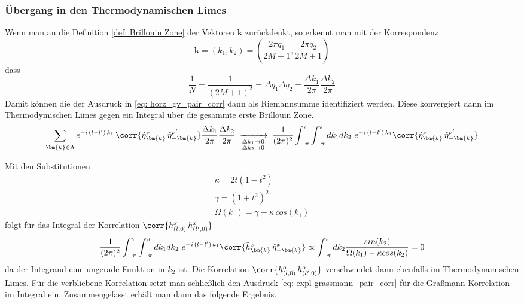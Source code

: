 \subsubsection{Übergang in den Thermodynamischen Limes}
Wenn man an die Definition \eqref{def: Brillouin Zone} der Vektoren $\bm{k}$ zurückdenkt, so erkennt man mit der Korrespondenz 
\begin{equation} \nonumber
\bm{k} = (k_1, k_2)  =  (\frac{2\pi q_1}{2M+1}, \frac{2\pi q_2}{2M+1}) 
\end{equation}
dass
\begin{equation} \nonumber
\frac{1}{N} = \frac{1}{(2M+1)^2} = \Delta q_1 \Delta q_2 = \frac{\Delta k_1}{2\pi}\frac{\Delta k_2}{2\pi} 
\end{equation}
Damit können die der Ausdruck in \eqref{eq: horz_gv_pair_corr} dann als Riemannsumme identifiziert werden. Diese konvergiert dann im Thermodymischen Limes gegen ein Integral über die gesammte erste Brillouin Zone. 
\begin{equation} \nonumber
\sum_{\bm{k} \in \bar{\Lambda}}  e^{-i\,(l-l') \,k_1} \,\corr{\hat{\eta}_{\bm{k}}^{\nu}\, \hat{\eta}_{-\bm{k}}^{\nu'}} \frac{\Delta k_1}{2\pi}\frac{\Delta k_2}{2\pi} \;\xrightarrow[\substack{\Delta k_1 \rightarrow 0 \\ \Delta k_2 \rightarrow 0 }]{}\; \frac{1}{(2\pi)^2}\int_{-\pi}^{\pi} \int_{-\pi}^{\pi} d k_1 d k_2 \,\,e^{-i\, (l-l') \,k_1} \corr{\hat{\eta}_{\bm{k}}^{\nu}\, \hat{\eta}_{-\bm{k}}^{\nu'}} 
\end{equation} 

\noindent Mit den Substitutionen 
\begin{align}
\kappa = 2t(1-t^2) \label{subs: kappa}\\
\gamma = (1+t^2)^2 \label{subs: gamma}\\
\Omega(k_1) = \gamma - \kappa\, cos(k_1) \label{subs: omega} 
\end{align}
folgt für das Integral der Korrelation $\corr{h^{x}_{(l,0)}\, h^{x}_{(l', 0)} }$
\begin{equation} \nonumber
\frac{1}{(2\pi)^2}\int_{-\pi}^{\pi} \int_{-\pi}^{\pi} d k_1 d k_2 \,\,e^{-i\,(l-l') \,k_1} \corr{\hat{h}_{\bm{k}}^{x}\, \hat{\eta}_{-\bm{k}}^{x}} \propto  \int_{-\pi}^{\pi} d k_2 \frac{sin(k_2)}{\Omega(k_1) - \kappa cos(k_2)} = 0 
\end{equation}
da der Integrand eine ungerade Funktion in $k_2$ ist. Die Korrelation $\corr{h^{o}_{(l,0)}\, h^{o}_{(l', 0)} } $ verschwindet dann ebenfalls im Thermodynamischen Limes. Für die verbliebene Korrelation setzt man schließlich den Ausdruck \eqref{eq: expl grassmann_pair_corr} für die Graßmann-Korrelation im Integral ein. Zusammengefasst erhält man dann das folgende Ergebnis.

